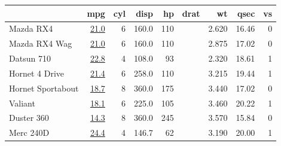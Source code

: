 \documentclass[
]{book}
\begin{document}
\begin{table}
\centering
\begin{tabular}[t]{l|>{}r|r|r|r|>{}r|r|r|r}
\hline
  & mpg & cyl & disp & hp & drat & wt & qsec & vs\\
\hline
Mazda RX4 & \href{https://haozhu233.github.io/kableExtra/}{\textcolor[HTML]{34B679}{21.0}} & 6 & 160.0 & 110 & \cellcolor[HTML]{43BF71}{\textcolor{white}{3.90}} & 2.620 & 16.46 & 0\\
\hline
Mazda RX4 Wag & \href{https://haozhu233.github.io/kableExtra/}{\textcolor[HTML]{34B679}{21.0}} & 6 & 160.0 & 110 & \cellcolor[HTML]{43BF71}{\textcolor{white}{3.90}} & 2.875 & 17.02 & 0\\
\hline
Datsun 710 & \href{https://haozhu233.github.io/kableExtra/}{\textcolor[HTML]{95D840}{22.8}} & 4 & 108.0 & 93 & \cellcolor[HTML]{37B878}{\textcolor{white}{3.85}} & 2.320 & 18.61 & 1\\
\hline
Hornet 4 Drive & \href{https://haozhu233.github.io/kableExtra/}{\textcolor[HTML]{44BF70}{21.4}} & 6 & 258.0 & 110 & \cellcolor[HTML]{414387}{\textcolor{white}{3.08}} & 3.215 & 19.44 & 1\\
\hline
Hornet Sportabout & \href{https://haozhu233.github.io/kableExtra/}{\textcolor[HTML]{26818E}{18.7}} & 8 & 360.0 & 175 & \cellcolor[HTML]{3C4F8A}{\textcolor{white}{3.15}} & 3.440 & 17.02 & 0\\
\hline
Valiant & \href{https://haozhu233.github.io/kableExtra/}{\textcolor[HTML]{2C728E}{18.1}} & 6 & 225.0 & 105 & \cellcolor[HTML]{440154}{\textcolor{white}{2.76}} & 3.460 & 20.22 & 1\\
\hline
Duster 360 & \href{https://haozhu233.github.io/kableExtra/}{\textcolor[HTML]{440154}{14.3}} & 8 & 360.0 & 245 & \cellcolor[HTML]{375A8C}{\textcolor{white}{3.21}} & 3.570 & 15.84 & 0\\
\hline
Merc 240D & \href{https://haozhu233.github.io/kableExtra/}{\textcolor[HTML]{FDE725}{24.4}} & 4 & 146.7 & 62 & \cellcolor[HTML]{1FA187}{\textcolor{white}{3.69}} & 3.190 & 20.00 & 1\\
\hline
\end{tabular}
\end{table}
\end{document}
